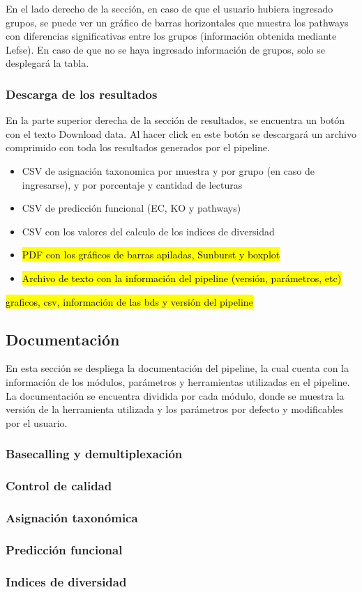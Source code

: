 En el lado derecho de la sección, en caso de que el usuario hubiera ingresado grupos, se puede ver un gráfico de barras horizontales que muestra los pathways con diferencias significativas entre los grupos (información obtenida mediante Lefse). En caso de que no se haya ingresado información de grupos, solo se desplegará la tabla.
\subsubsection{Descarga de los resultados}
En la parte superior derecha de la sección de resultados, se encuentra un botón con el texto Download data. Al hacer click en este botón se descargará un archivo comprimido con toda los resultados generados por el pipeline.
\begin{itemize}
    \item CSV de asignación taxonomica por muestra y por grupo (en caso de ingresarse), y por porcentaje y cantidad de lecturas
    \item CSV de predicción funcional (EC, KO y pathways)
    \item CSV con los valores del calculo de los indices de diversidad
    \item \hl{PDF con los gráficos de barras apiladas, Sunburst y boxplot}
    \item \hl{Archivo de texto con la información del pipeline (versión, parámetros, etc)}
\end{itemize}
\hl{graficos, csv, información de las bds y versión del pipeline}
\subsection{Documentación}
En esta sección se despliega la documentación del pipeline, la cual cuenta con la información de los módulos, parámetros y herramientas utilizadas en el pipeline. La documentación se encuentra dividida por cada módulo, donde se muestra la versión de la herramienta utilizada y los parámetros por defecto y modificables por el usuario.
\subsubsection{Basecalling y demultiplexación}
\subsubsection{Control de calidad}
\subsubsection{Asignación taxonómica}
\subsubsection{Predicción funcional}
\subsubsection{Indices de diversidad}

